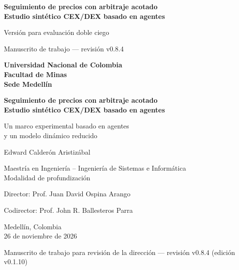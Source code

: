 \documentclass[11pt,letterpaper]{report}
\newcommand{\versionTesis}{v0.1.10}
\newcommand{\revisionManuscrito}{v0.8.4}
\numberwithin{equation}{chapter}
\begin{document}
\begin{titlepage}
  \thispagestyle{empty}
  \centering
  \singlespacing
  \ifdefined\blindreviewmode
  \vspace*{4cm}
  {\LARGE\bfseries Seguimiento de precios con arbitraje acotado\\
  Estudio sintético CEX/DEX basado en agentes\par}
  \vspace{1.2cm}
  {\Large Versión para evaluación doble ciego\par}
  \vfill
  {\small Manuscrito de trabajo --- revisión \revisionManuscrito{}\par}
  \else
  {\large\bfseries Universidad Nacional de Colombia\\[2pt]
  Facultad de Minas\\[2pt]
  Sede Medellín\par}
  \vspace{3.2cm}
  {\LARGE\bfseries Seguimiento de precios con arbitraje acotado\\
  Estudio sintético CEX/DEX basado en agentes\par}
  \vspace{0.9cm}
  {\Large Un marco experimental basado en agentes\\
  y un modelo dinámico reducido\par}
  \vspace{2.6cm}
  {\Large Edward Calderón Aristizábal\par}
  \vspace{1.6cm}
  {\large Maestría en Ingeniería -- Ingeniería de Sistemas e Informática\\[2pt]
  Modalidad de profundización\par}
  \vspace{0.8cm}
  {\large Director: Prof. Juan David Ospina Arango\par}
  {\large Codirector: Prof. John R. Ballesteros Parra\par}
  \vfill
  {\large Medellín, Colombia\\[2pt]
  26 de noviembre de 2026\par}
  \vspace{0.3cm}
  {\small Manuscrito de trabajo para revisión de la dirección --- revisión \revisionManuscrito{} (edición \versionTesis{})\par}
  \fi
\end{titlepage}

\setcounter{page}{1}
\end{document}
